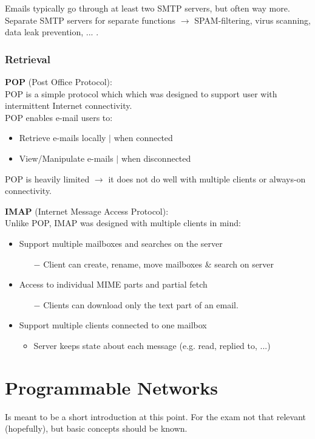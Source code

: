 \documentclass[a4paper, fontsize=8pt, landscape, DIV=1]{scrartcl}
\begin{document}
\begin{multicols*}{4}
		Emails typically go through at least two SMTP servers, but often way more.
		Separate SMTP servers for separate functions $\rightarrow$ SPAM-filtering, virus
		scanning, data leak prevention, ... .\\
		
		\subsubsection{Retrieval}
		\textbf{POP} (Post Office Protocol):\\
		POP is a simple protocol which which was designed to support user with
		intermittent Internet connectivity.\\
		POP enables e-mail users to:
		\begin{itemize}[noitemsep]
			\item Retrieve e-mails locally $\vert$ when connected
			\item View/Manipulate e-mails $\vert$ when disconnected
		\end{itemize} 
		POP is heavily limited $\rightarrow$ it does not do well with multiple clients
		or always-on connectivity.\par 
		
		\textbf{IMAP} (Internet Message Access Protocol):\\
		Unlike POP, IMAP was designed with multiple clients in mind: 
		\begin{itemize}[noitemsep]
			\item Support multiple mailboxes and searches on the server
			\begin{itemize}
				\item[$-$] Client can create, rename, move mailboxes \& search on server
			\end{itemize}
			\item Access to individual MIME parts and partial fetch
			\begin{itemize}
				\item[$-$] Clients can download only the text part of an email. 
			\end{itemize}
			\item Support multiple clients connected to one mailbox
			\begin{itemize}
				\item Server keeps state about each message (e.g. read, replied to, ...)
			\end{itemize}
		\end{itemize} 
		
		\section{Programmable Networks}
		Is meant to be a short introduction at this point. For the exam not that relevant (hopefully), but basic concepts should be known.
		

\end{multicols*}
\end{document}
